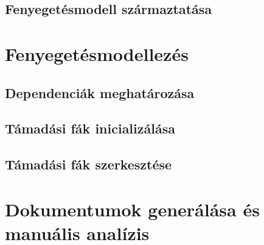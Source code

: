 \subsection{Fenyegetésmodell származtatása}

\section{Fenyegetésmodellezés}

\subsection{Dependenciák meghatározása}

\subsection{Támadási fák inicializálása}

\subsection{Támadási fák szerkesztése}

\section{Dokumentumok generálása és manuális analízis}